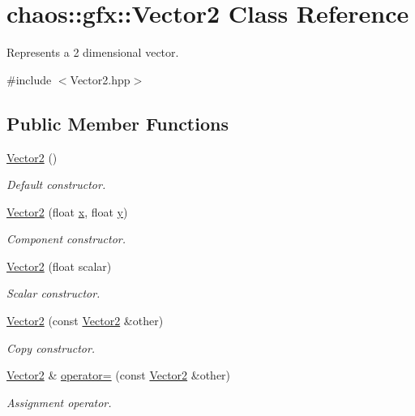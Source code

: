 \hypertarget{classchaos_1_1gfx_1_1_vector2}{}\section{chaos\+:\+:gfx\+:\+:Vector2 Class Reference}
\label{classchaos_1_1gfx_1_1_vector2}


Represents a 2 dimensional vector.  




{\ttfamily \#include $<$Vector2.\+hpp$>$}

\subsection*{Public Member Functions}
\begin{DoxyCompactItemize}
\item 
\hyperlink{classchaos_1_1gfx_1_1_vector2_a9803cd26cb4f18bd3bc0f646af5bc35e}{Vector2} ()
\begin{DoxyCompactList}\small\item\em Default constructor. \end{DoxyCompactList}\item 
\hyperlink{classchaos_1_1gfx_1_1_vector2_ac01190ae1b84237183e213db95fd0606}{Vector2} (float \hyperlink{classchaos_1_1gfx_1_1_vector2_a98989a2809ad9c6ac3091550ad5f5118}{x}, float \hyperlink{classchaos_1_1gfx_1_1_vector2_adf4d8ed8e49c84c2fe1596c2b9d55d49}{y})
\begin{DoxyCompactList}\small\item\em Component constructor. \end{DoxyCompactList}\item 
\hyperlink{classchaos_1_1gfx_1_1_vector2_adb6901e860aeb3c7bffb4235d75ffaa6}{Vector2} (float scalar)
\begin{DoxyCompactList}\small\item\em Scalar constructor. \end{DoxyCompactList}\item 
\hyperlink{classchaos_1_1gfx_1_1_vector2_ac09ba6b8b19d06f79a2de9498fdc272c}{Vector2} (const \hyperlink{classchaos_1_1gfx_1_1_vector2}{Vector2} \&other)
\begin{DoxyCompactList}\small\item\em Copy constructor. \end{DoxyCompactList}\item 
\hyperlink{classchaos_1_1gfx_1_1_vector2}{Vector2} \& \hyperlink{classchaos_1_1gfx_1_1_vector2_a8d20c5c57ae0f34a83710df13846c9ef}{operator=} (const \hyperlink{classchaos_1_1gfx_1_1_vector2}{Vector2} \&other)
\begin{DoxyCompactList}\small\item\em Assignment operator. \end{DoxyCompactList}\end{DoxyCompactItemize}
